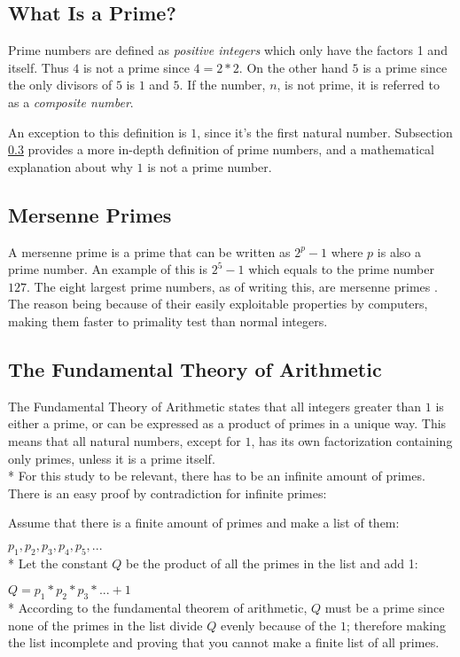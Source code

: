 \documentclass[main.tex]{subfiles}
\begin{document}
\subsection{What Is a Prime?}
Prime numbers are defined as \textit{positive integers} which only have the
factors 1 and itself. Thus $4$ is not a prime since $4 = 2 * 2$. On the other
hand $5$ is a prime since the only divisors of $5$ is $1$ and $5$. If the
number, $n$, is not prime, it is referred to as a \textit{composite number}.

An exception to this definition is $1$, since it's the first natural number.
Subsection \ref{arithmetic} provides a more in-depth definition of prime
numbers, and a mathematical explanation about why $1$ is not a prime number.

\subsection{Mersenne Primes}
A mersenne prime is a prime that can be written as $2^{p}-1$ where $p$ is also a
prime number. An example of this is $2^5-1$ which equals to the prime number
$127$. The eight largest prime numbers, as of writing this, are mersenne primes
\cite{prime:largest_digits}. The reason being because of their easily
exploitable properties by computers, making them faster to primality test than
normal integers.

\subsection{The Fundamental Theory of Arithmetic} \label{arithmetic} The
Fundamental Theory of Arithmetic \cite{theorem:arithmetic} states that all
integers greater than $1$ is either a prime, or can be expressed as a product of
primes in a unique way. This means that all natural numbers, except for $1$, has
its own factorization containing only primes, unless it is a prime itself.
\newline
\\*
For this study to be relevant, there has to be an infinite amount of primes.
There is an easy proof by contradiction for infinite primes:

\begin{mdframed}
  Assume that there is a finite amount of primes and make a list of them:

  $p_1, p_2, p_3, p_4, p_5, ...$ \newline
  \\*
  Let the constant $Q$ be the product of all the primes in the list and add 1:

  $Q = p_1 * p_2 * p_3 * ... + 1$ \newline
  \\*
  According to the fundamental theorem of arithmetic, $Q$ must be a prime since
  none of the primes in the list divide $Q$ evenly because of the $1$; therefore
  making the list incomplete and proving that you cannot make a finite list of
  all primes.
\end{mdframed}
\end{document}
